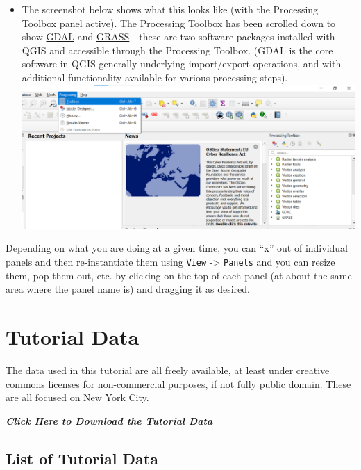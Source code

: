 \documentclass[
  letterpaper,
  DIV=11,
  numbers=noendperiod]{scrreprt}
\providecommand{\tightlist}{%
  \setlength{\itemsep}{0pt}\setlength{\parskip}{0pt}}\usepackage{longtable,booktabs,array}
\begin{document}
\begin{itemize}
\begin{itemize}
    \begin{itemize}
    \tightlist
    \item
      The screenshot below shows what this looks like (with the
      Processing Toolbox panel active). The Processing Toolbox has been
      scrolled down to show \href{https://gdal.org/}{GDAL} and
      \href{https://grass.osgeo.org/}{GRASS} - these are two software
      packages installed with QGIS and accessible through the Processing
      Toolbox. (GDAL is the core software in QGIS generally underlying
      import/export operations, and with additional functionality
      available for various processing steps).
      \includegraphics{./images/ProcessingToolbox.png}
    \end{itemize}
  \end{itemize}
\end{itemize}

Depending on what you are doing at a given time, you can ``x'' out of
individual panels and then re-instantiate them using \texttt{View}
-\textgreater{} \texttt{Panels} and you can resize them, pop them out,
etc. by clicking on the top of each panel (at about the same area where
the panel name is) and dragging it as desired.


\hypertarget{tutorial-data}{%
\chapter{Tutorial Data}\label{tutorial-data}}

The data used in this tutorial are all freely available, at least under
creative commons licenses for non-commercial purposes, if not fully
public domain. These are all focused on New York City.

\textbf{\emph{\href{./QGIS_Tutorial_Data.zip}{Click Here to Download the
Tutorial Data}}}

\hypertarget{list-of-tutorial-data}{%
\section{List of Tutorial Data}\label{list-of-tutorial-data}}
\end{document}
